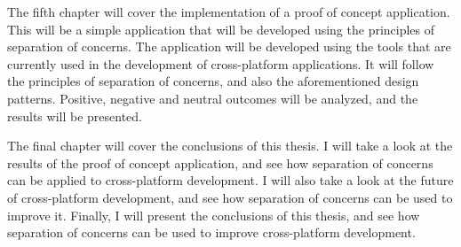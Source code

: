 \par
The fifth chapter will cover the implementation of a proof of concept application.
This will be a simple application that will be developed using the principles of separation of concerns.
The application will be developed using the tools that are currently used in the development of cross-platform applications.
It will follow the principles of separation of concerns, and also the aforementioned design patterns.
Positive, negative and neutral outcomes will be analyzed, and the results will be presented.


\par
The final chapter will cover the conclusions of this thesis.
I will take a look at the results of the proof of concept application, and see how separation of concerns can be applied to cross-platform development.
I will also take a look at the future of cross-platform development, and see how separation of concerns can be used to improve it.
Finally, I will present the conclusions of this thesis, and see how separation of concerns can be used to improve cross-platform development.
